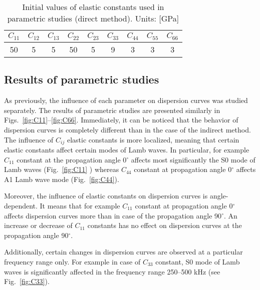 \documentclass[]{spie}  %
\begin{document}
\begin{table}[h!]
	\renewcommand{\arraystretch}{1.3}
	\caption{Initial values of elastic constants used in parametric studies (direct method). 
	Units: [GPa]}
		\label{tab:Ctensor_initial}
	\begin{center}
		\begin{tabular}{ccccccccc} 
			\toprule
			\(C_{11}\) & \(C_{12}\) & \(C_{13}\)  & \(C_{22}\) & \(C_{23}\) & \(C_{33}\) & 
			\(C_{44}\)  & \(C_{55}\) & \(C_{66}\) \\
			\midrule
			50 &5& 5&  50 & 5 & 9 & 3 & 3 & 3\\
			\bottomrule 
		\end{tabular} 
	\end{center}
\end{table}

\subsection{Results of parametric studies}
As previously, the influence of each parameter on dispersion curves was studied separately. 
The results of parametric studies are presented similarly in Figs.~\ref{fig:C11}--\ref{fig:C66}.
Immediately, it can be noticed that the behavior of dispersion curves is completely different than in the case of the indirect method. 
The influence of \(C_{ij}\) elastic constants is more localized, meaning that certain elastic constants affect certain modes of Lamb waves. 
In particular, for example \(C_{11}\) constant at the propagation angle 0\(^{\circ}\) affects most significantly the S0 mode of Lamb waves (Fig.~\ref{fig:C11} ) whereas \(C_{44}\) constant at propagation angle 0\(^{\circ}\) affects A1 Lamb wave mode (Fig.~\ref{fig:C44}).

Moreover, the influence of elastic constants on dispersion curves is angle-dependent. 
It means that  for example \(C_{11}\) constant at propagation angle 0\(^{\circ}\) affects dispersion curves more than in case of the propagation angle 90\(^{\circ}\). 
An increase or decrease of  \(C_{11}\) constants has no effect on dispersion curves at  the propagation angle 90\(^{\circ}\). 

Additionally, certain changes in dispersion curves are observed at a particular frequency range only. 
For example in case of  \(C_{33}\) constant, S0 mode of Lamb waves is significantly affected in the frequency range 250--500 kHz (see Fig.~\ref{fig:C33}).
\end{document}
